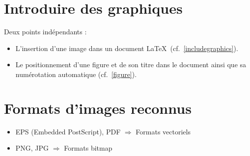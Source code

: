 













\section{Introduire des graphiques}
\label{graphics}

\vfill

Deux points indépendants :

\begin{itemize}
\item L'insertion d'une image dans un document \LaTeX\ 
  (cf.~\ref{includegraphics}).
\item Le positionnement d'une figure et de son titre dans le document ainsi que
  sa numérotation automatique (cf.~\ref{figure}).
\end{itemize}

\vfill



\section{Formats d'images reconnus}
\label{sec:formats-graphiques}


\vfill
\begin{itemize}
\item EPS (Embedded PostScript), PDF $\Rightarrow$ Formats vectoriels
\item PNG, JPG $\Rightarrow$ Formats bitmap
\end{itemize}


